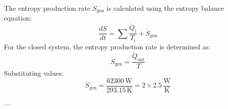 The entropy production rate \( \dot{S}_{\text{gen}} \) is calculated using the entropy balance equation:  
\[
\frac{dS}{dt} = \sum \frac{\dot{Q}_i}{T_i} + \dot{S}_{\text{gen}}
\]  
For the closed system, the entropy production rate is determined as:  
\[
\dot{S}_{\text{gen}} = \frac{\dot{Q}_{\text{out}}}{T}
\]  
Substituting values:  
\[
\dot{S}_{\text{gen}} = \frac{62300 \, \text{W}}{293.15 \, \text{K}} = 2 \times 2.5 \, \frac{\text{W}}{\text{K}}
\]  

---